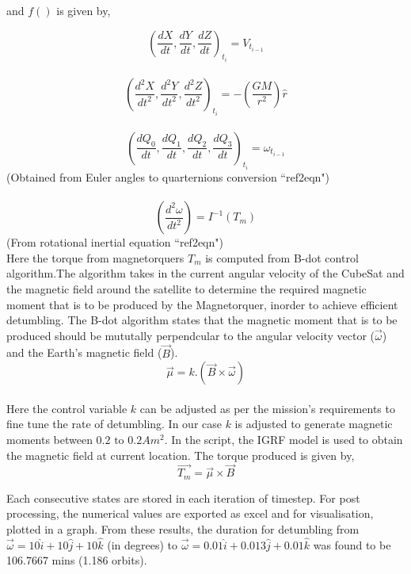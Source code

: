 \documentclass[11pt]{report}
\begin{document}
	\noindent and $f()$ is given by,
	
	$$\left(\frac{dX}{dt},\frac{dY}{dt},\frac{dZ}{dt}\right)_{t_i} = V_{t_{i-1}}$$\\
	$$\left(\frac{d^2X}{dt^2},\frac{d^2Y}{dt^2},\frac{d^2Z}{dt^2}\right)_{t_i} = -\left(\frac{GM}{r^2}\right)\hat{r}$$\\
	$$\left(\frac{dQ_0}{dt},\frac{dQ_1}{dt},\frac{dQ_2}{dt},\frac{dQ_3}{dt}\right)_{t_i} = \omega_{t_{i-1}}$$
	\hspace{35pt} (Obtained from Euler angles to quarternions conversion ``ref2eqn")\\\\
	\pagebreak
	$$\left(\frac{d^2\omega}{dt^2}\right) = I^{-1}(T_m)$$
	\hspace{100pt} (From rotational inertial equation ``ref2eqn")\\
	
	Here the torque from magnetorquers $T_m$ is computed from B-dot control algorithm.The algorithm takes in the current angular velocity of the CubeSat and the magnetic field around the satellite to determine the required magnetic moment that is to be produced by the Magnetorquer, inorder to achieve efficient detumbling. The B-dot algorithm states that the magnetic moment that is to be produced should be mututally perpendcular to the angular velocity vector ($\vec{\omega}$) and the Earth's magnetic field ($\vec{B}$).\\
	$$\vec{\mu} = k.\left(\vec{B}\times\vec{\omega}\right)$$\\
	Here the control variable $k$ can be adjusted as per the mission's requirements to fine tune the rate of detumbling. In our case $k$ is adjusted to generate magnetic moments between $0.2\text{ to }0.2Am^2$. In the script, the IGRF model is used to obtain the magnetic field at current location. The torque produced is given by, $$\vec{T_m} = \vec{\mu}\times\vec{B}$$
	
	Each consecutive states are stored in each iteration of timestep. For post processing, the numerical values are exported as excel and for visualisation, plotted in a graph. From these results, the duration for detumbling from $\vec{\omega}=10\hat{i}+10\hat{j}+10\hat{k}$ (in degrees) to $\vec{\omega}=0.01\hat{i}+0.013\hat{j}+0.01\hat{k}$ was found to be 106.7667 mins (1.186 orbits).
	
	
	
\end{document}
